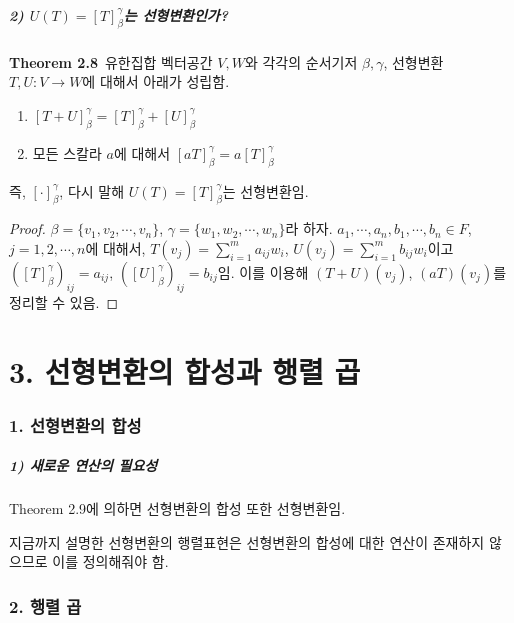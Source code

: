 \subsubsection*{2) $U(T)=[T]_{\beta}^{\gamma}$는 선형변환인가?}
\textbf{Theorem 2.8}\, 유한집합 벡터공간 $V,W$와 각각의 순서기저 $\beta,\gamma$, 선형변환 $T,U:V \rightarrow W$에 대해서 아래가 성립함.

\begin{enumerate}
    \item $[T+U]_{\beta}^{\gamma}=[T]_{\beta}^{\gamma}+[U]_{\beta}^{\gamma}$
    \item 모든 스칼라 $a$에 대해서 $[aT]_{\beta}^{\gamma}=a[T]_{\beta}^{\gamma}$
\end{enumerate}

즉, $[\cdot]_{\beta}^{\gamma}$, 다시 말해 $U(T)=[T]_{\beta}^{\gamma}$는 선형변환임.

\begin{proof}
$\beta = \{v_1,v_2, \cdots ,v_n\}$, $\gamma = \{w_1,w_2, \cdots ,w_n\}$라 하자. $a_1, \cdots ,a_n, b_1, \cdots ,b_n \in F$, $j=1,2, \cdots ,n$에 대해서, $T(v_j)=\sum_{i=1}^{m}{a_{ij}w_i}$, $U(v_j)=\sum_{i=1}^{m}{b_{ij}w_i}$이고 $([T]_{\beta}^{\gamma})_{ij}=a_{ij}$, $([U]_{\beta}^{\gamma})_{ij}=b_{ij}$임. 이를 이용해 $(T+U)(v_j)$, $(aT)(v_j)$를 정리할 수 있음.
\end{proof}


\newpage


\part*{3. 선형변환의 합성과 행렬 곱}

\section*{1. 선형변환의 합성}

\subsubsection*{1) 새로운 연산의 필요성}
Theorem 2.9에 의하면 선형변환의 합성 또한 선형변환임.

지금까지 설명한 선형변환의 행렬표현은 선형변환의 합성에 대한 연산이 존재하지 않으므로 이를 정의해줘야 함.\\


\section*{2. 행렬 곱}

